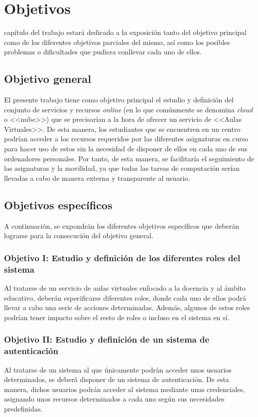 \chapter{Objetivos}
\label{chap:objetivos}

\noindent
{} capítulo del trabajo estará dedicado a la exposición tanto del objetivo principal como de los diferentes objetivos parciales del mismo, así como los posibles problemas o dificultades que pudiera conllevar cada uno de ellos.

\section{Objetivo general}
El presente trabajo tiene como objetivo principal el estudio y definición del conjunto de servicios y recursos \textit{online} (en lo que comúnmente se denomina \textit{cloud} o <<nube>>) que se precisarían a la hora de ofrecer un servicio de <<Aulas Virtuales>>. De esta manera, los estudiantes que se encuentren en un centro podrían acceder a los recursos requeridos por las diferentes asignaturas en curso para hacer uso de estos sin la necesidad de disponer de ellos en cada uno de sus ordenadores personales. Por tanto, de esta manera, se facilitaría el seguimiento de las asignaturas y la movilidad, ya que todas las tareas de computación serían llevadas a cabo de manera externa y transparente al usuario.

\section{Objetivos específicos}
A continuación, se expondrán los diferentes objetivos específicos que deberán lograrse para la consecución del objetivo general.

\subsection{Objetivo I: Estudio y definición de los diferentes roles del sistema}
Al tratarse de un servicio de aulas virtuales enfocado a la docencia y al ámbito educativo, deberán especificarse diferentes roles, donde cada uno de ellos podrá llevar a cabo una serie de acciones determinadas. Además, algunos de estos roles podrían tener impacto sobre el resto de roles o incluso en el sistema en sí.

\subsection{Objetivo II: Estudio y definición de un sistema de autenticación}
Al tratarse de un sistema al que únicamente podrán acceder unos usuarios determinados, se deberá disponer de un sistema de autenticación. De esta manera, dichos usuarios podrán acceder al sistema mediante unas credenciales, asignando unos recursos determinados a cada uno según sus necesidades predefinidas.

